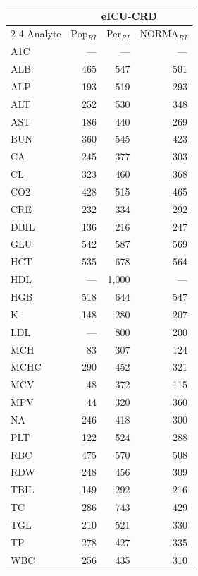 \begin{table}[ht]
\centering
\footnotesize
\begin{tabular}{lrrr}
\toprule
 & \multicolumn{3}{c}{eICU-CRD} \\
\cmidrule(lr){2-4}
Analyte & Pop$_{RI}$ & Per$_{RI}$ & NORMA$_{RI}$ \\
\midrule
A1C & --- & --- & --- \\
ALB & 465 & 547 & 501 \\
ALP & 193 & 519 & 293 \\
ALT & 252 & 530 & 348 \\
AST & 186 & 440 & 269 \\
BUN & 360 & 545 & 423 \\
CA & 245 & 377 & 303 \\
CL & 323 & 460 & 368 \\
CO2 & 428 & 515 & 465 \\
CRE & 232 & 334 & 292 \\
DBIL & 136 & 216 & 247 \\
GLU & 542 & 587 & 569 \\
HCT & 535 & 678 & 564 \\
HDL & --- & 1,000 & --- \\
HGB & 518 & 644 & 547 \\
K & 148 & 280 & 207 \\
LDL & --- & 800 & 200 \\
MCH & 83 & 307 & 124 \\
MCHC & 290 & 452 & 321 \\
MCV & 48 & 372 & 115 \\
MPV & 44 & 320 & 360 \\
NA & 246 & 418 & 300 \\
PLT & 122 & 524 & 288 \\
RBC & 475 & 570 & 508 \\
RDW & 248 & 456 & 309 \\
TBIL & 149 & 292 & 216 \\
TC & 286 & 743 & 429 \\
TGL & 210 & 521 & 330 \\
TP & 278 & 427 & 335 \\
WBC & 256 & 435 & 310 \\
\bottomrule
\end{tabular}
\label{tab:07_prevalence_interpretable}
\end{table}